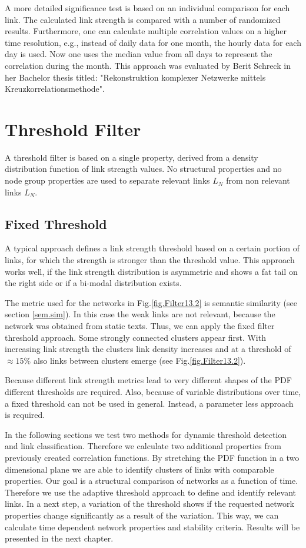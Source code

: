 \documentclass[a4paper,10pt]{scrbook}
\begin{document}
A more detailed significance test is based on an individual comparison for each link. The calculated link strength is compared with a number of randomized results. Furthermore, one can calculate multiple correlation values on a higher time resolution, e.g., instead of daily data for one month, the hourly data for each day is used. Now one uses the median value from all days to represent the correlation during the month. This approach was evaluated by Berit Schreck \cite{Schreck.BA} in her Bachelor thesis titled: "Rekonstruktion komplexer Netzwerke mittels Kreuzkorrelationsmethode".

 
\section{Threshold Filter}
A threshold filter is based on a single property, derived from a density distribution function of link strength values. No structural properties and no node group properties are used to separate relevant links $L_N$ from non relevant links $L_N$.

\subsection{Fixed Threshold}
A typical approach defines a link strength threshold based on a certain portion of links, for which the strength is stronger than the threshold value. This approach works well, if the link strength distribution is asymmetric and shows a fat tail on the right side or if a bi-modal distribution exists. 

\label{ext.fig.Filter13.2} 


The metric used for the networks in Fig.\ref{fig.Filter13.2} is semantic similarity (see section \ref{sem.sim}). In this case the weak links are not relevant, because the network was obtained from static texts. Thus, we can apply the fixed filter threshold approach. Some strongly connected clusters appear first. With increasing link strength the clusters link density increases and at a threshold of $\approx 15\%$ also links between clusters emerge (see Fig.\ref{fig.Filter13.2}).

Because different link strength metrics lead to very different shapes of the PDF different thresholds are required. Also, because of variable distributions over time, a fixed threshold can not be used in general. Instead, a parameter less approach is required. 

In the following sections we test two methods for dynamic threshold detection and link classification.
Therefore we calculate two additional properties from previously created correlation functions. By stretching the PDF function in a two dimensional plane we are able to identify clusters of links with comparable properties. Our goal is a structural comparison of networks as a function of time. Therefore we use the adaptive threshold approach to define and identify relevant links. In a next step, a variation of the threshold shows if the requested
network properties change significantly as a result of the variation. This way, we can calculate time dependent network properties and stability criteria. Results will be presented in the next chapter. 
\end{document}
